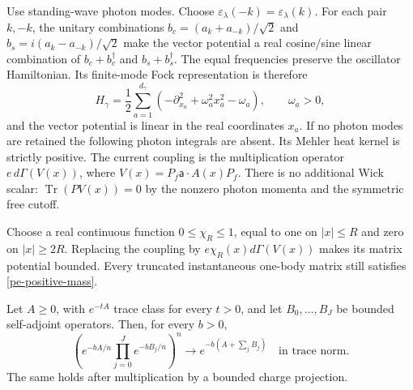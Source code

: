 Use standing-wave photon modes. Choose
\(\varepsilon_\lambda(-k)=\varepsilon_\lambda(k)\).
For each pair \(k,-k\), the unitary combinations
\(b_c=(a_k+a_{-k})/\sqrt2\) and
\(b_s=i(a_k-a_{-k})/\sqrt2\) make the vector potential a real
cosine/sine linear combination of \(b_c+b_c^\dagger\) and
\(b_s+b_s^\dagger\).
The equal frequencies preserve the oscillator Hamiltonian.
Its finite-mode Fock representation is therefore
\begin{equation}
H_\gamma=\frac12\sum_{a=1}^{d_\gamma}
  (-\partial_{x_a}^2+\omega_a^2x_a^2-\omega_a),
\qquad \omega_a>0,
\label{pe-oscillator}
\end{equation}
and the vector potential is linear in the real coordinates \(x_a\).
If no photon modes are retained the following photon integrals are
absent. Its Mehler heat kernel is strictly positive. The current
coupling is the multiplication operator
\(e\,d\Gamma(V(x))\), where
\(V(x)=P_f\boldsymbol{\mathsf a}\cdot A(x)P_f\).
There is no additional Wick scalar: \(\operatorname{Tr}(PV(x))=0\)
by the nonzero photon momenta and the symmetric free cutoff.

Choose a real continuous function \(0\le\chi_R\le1\), equal to one
on \(|x|\le R\) and zero on \(|x|\ge2R\). Replacing the coupling
by \(e\chi_R(x)d\Gamma(V(x))\) makes its matrix potential bounded.
Every truncated instantaneous one-body matrix still satisfies
\eqref{pe-positive-mass}.

\begin{lemma}
\label{pe-trotter}
Let \(A\ge0\), with \(e^{-tA}\) trace class for every \(t>0\),
and let \(B_0,\ldots,B_J\) be bounded self-adjoint operators. Then,
for every \(b>0\),
\[
\left(e^{-bA/n}\prod_{j=0}^J e^{-bB_j/n}\right)^n
\longrightarrow e^{-b(A+\sum_jB_j)}
\quad\text{in trace norm}.
\]
The same holds after multiplication by a bounded charge projection.
\end{lemma}

